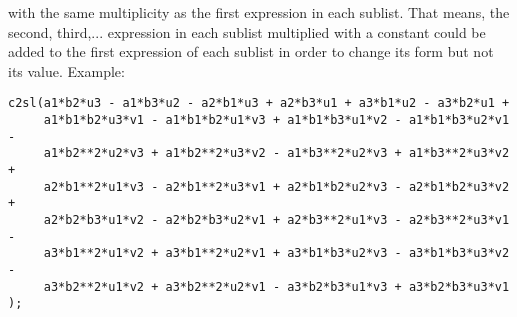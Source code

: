 \documentclass[12pt]{article}
\begin{document}
\begin{description}
  with the same multiplicity as the first expression in each
  sublist. That means, the second, third,... expression in each
  sublist multiplied with a constant could be added to the first
  expression of each sublist in order to change its form but not its
  value. Example: \begin{verbatim}
c2sl(a1*b2*u3 - a1*b3*u2 - a2*b1*u3 + a2*b3*u1 + a3*b1*u2 - a3*b2*u1 +
     a1*b1*b2*u3*v1 - a1*b1*b2*u1*v3 + a1*b1*b3*u1*v2 - a1*b1*b3*u2*v1 -
     a1*b2**2*u2*v3 + a1*b2**2*u3*v2 - a1*b3**2*u2*v3 + a1*b3**2*u3*v2 +
     a2*b1**2*u1*v3 - a2*b1**2*u3*v1 + a2*b1*b2*u2*v3 - a2*b1*b2*u3*v2 +
     a2*b2*b3*u1*v2 - a2*b2*b3*u2*v1 + a2*b3**2*u1*v3 - a2*b3**2*u3*v1 -
     a3*b1**2*u1*v2 + a3*b1**2*u2*v1 + a3*b1*b3*u2*v3 - a3*b1*b3*u3*v2 -
     a3*b2**2*u1*v2 + a3*b2**2*u2*v1 - a3*b2*b3*u1*v3 + a3*b2*b3*u3*v1 );


\end{verbatim}
\end{description}
\end{document}
